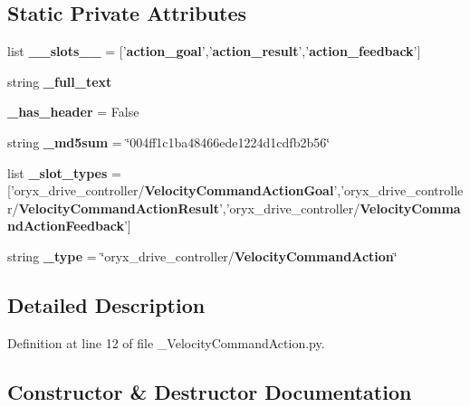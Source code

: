\subsection*{\-Static \-Private \-Attributes}
\begin{DoxyCompactItemize}
\item 
list {\bf \-\_\-\-\_\-slots\-\_\-\-\_\-} = ['{\bf action\-\_\-goal}','{\bf action\-\_\-result}','{\bf action\-\_\-feedback}']
\item 
string {\bf \-\_\-full\-\_\-text}
\item 
{\bf \-\_\-has\-\_\-header} = \-False
\item 
string {\bf \-\_\-md5sum} = \char`\"{}004ff1c1ba48466ede1224d1cdfb2b56\char`\"{}
\item 
list {\bf \-\_\-slot\-\_\-types} = ['oryx\-\_\-drive\-\_\-controller/{\bf \-Velocity\-Command\-Action\-Goal}','oryx\-\_\-drive\-\_\-controller/{\bf \-Velocity\-Command\-Action\-Result}','oryx\-\_\-drive\-\_\-controller/{\bf \-Velocity\-Command\-Action\-Feedback}']
\item 
string {\bf \-\_\-type} = \char`\"{}oryx\-\_\-drive\-\_\-controller/{\bf \-Velocity\-Command\-Action}\char`\"{}
\end{DoxyCompactItemize}


\subsection{\-Detailed \-Description}


\-Definition at line 12 of file \-\_\-\-Velocity\-Command\-Action.\-py.



\subsection{\-Constructor \& \-Destructor \-Documentation}
